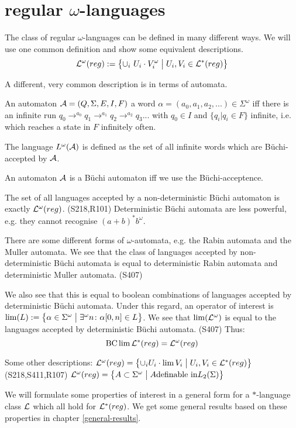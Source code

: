 \section{regular $\omega$-languages}
\label{reg-omega-lang}

The class of regular $\omega$-languages can be defined in many different ways. We will use one common definition and show some equivalent descriptions.
\[ \Lang^\omega(reg) := \Set{ \cup_i\ U_i \cdot V_i^\omega }{ U_i, V_i \in \Lang^*(reg) } \]

A different, very common description is in terms of automata.

An automaton $\mathcal{A} = (Q, \Sigma, E, I, F)$  a word $\alpha = (a_0,a_1,a_2,...) \in \Sigma^\omega$ iff there is an infinite run $q_0 \rightarrow^{a_0} q_1 \rightarrow^{a_1} q_2 \rightarrow^{a_2} q_3 ...$ with $q_0 \in I$ and $\{ q_i | q_i \in F \}$ infinite, i.e. which reaches a state in $F$ infinitely often.

The language $L^\omega(\mathcal{A})$ is defined as the set of all infinite words which are Büchi-accepted by  $\mathcal{A}$.

An automaton $\mathcal{A}$ is a Büchi automaton iff we use the Büchi-acceptence.

The set of all languages accepted by a non-deterministic Büchi automaton is exactly $\mathcal{L}^\omega(reg)$. (S218,R101) Deterministic Büchi automata are less powerful, e.g. they cannot recognise $(a+b)^* b^\omega$.

There are some different forms of $\omega$-automata, e.g. the Rabin automata and the Muller automata. We see that the class of languages accepted by non-deterministic Büchi automata is equal to deterministic Rabin automata and deterministic Muller automata. (S407)

We also see that this is equal to boolean combinations of languages accepted by deterministic Büchi automata. Under this regard, an operator of interest is $\lim(L) := \Set{ \alpha \in \Sigma^\omega }{ \exists^\omega n \colon \alpha[0,n] \in L }$. We see that $\lim(\mathcal{L}^\omega)$ is equal to the languages accepted by deterministic Büchi automata. (S407) Thus:
\[  \operatorname{BC} \lim \mathcal{L}^*(reg) = \mathcal{L}^\omega(reg) \]

Some other descriptions:
$\Lang^\omega(reg) = \Set{ \cup_i U_i \cdot \lim V_i }{ U_i, V_i \in \Lang^*(reg) }$ (S218,S411,R107)
$\Lang^\omega(reg) = \Set{A \subset \Sigma^\omega}{A \text{definable in} L_2(\Sigma)}$

We will formulate some properties of interest in a general form for a $*$-language class $\mathcal{L}$ which all hold for $\mathcal{L}^*(reg)$. We get some general results based on these properties in chapter \ref{general-results}.

